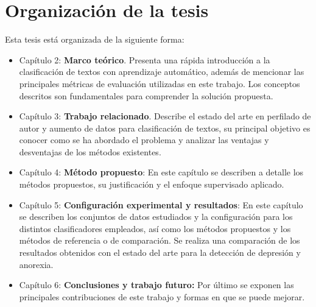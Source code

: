 \section{Organización de la tesis}

Esta tesis está organizada de la siguiente forma: 


\begin{itemize}
\item Capítulo 2: \textbf{Marco teórico}. Presenta una rápida introducción a la clasificación de textos con aprendizaje automático, además de mencionar las principales métricas de evaluación utilizadas en este trabajo. Los conceptos descritos son fundamentales para comprender la solución propuesta.


\item Capítulo 3: \textbf{Trabajo relacionado}. Describe el estado del arte en perfilado de autor y aumento de datos para clasificación de textos, su principal objetivo es conocer como se ha abordado el problema y  analizar las ventajas y desventajas de los métodos existentes.



\item Capítulo 4: \textbf{Método propuesto}: En este capítulo se describen a detalle los métodos propuestos, su justificación y el enfoque supervisado aplicado.

\item Capítulo 5: \textbf{Configuración experimental y resultados}: En este capítulo se describen los conjuntos de datos estudiados y la configuración para los distintos clasificadores empleados, así como los métodos propuestos y los métodos de referencia o de comparación. Se realiza una comparación de los resultados obtenidos con el estado del arte para la detección de depresión y anorexia.


\item Capítulo 6: \textbf{Conclusiones y trabajo futuro:} Por último se exponen las principales contribuciones de este trabajo y formas en que se puede mejorar.

\end{itemize}

